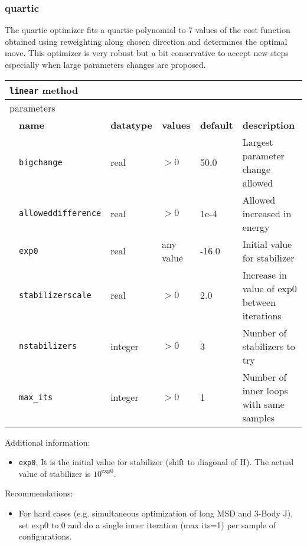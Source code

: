 \subsubsection{quartic}
The quartic optimizer fits a quartic polynomial to 7 values of the cost function obtained using reweighting along chosen direction and determines the optimal move.
This optimizer is very robust but a bit conservative to accept new steps especially when large parameters changes are proposed.
\begin{table}[h]
\begin{center}
\begin{tabularx}{\textwidth}{l l l l l l }
\hline
\multicolumn{6}{l}{\texttt{linear} method} \\
\hline
\multicolumn{2}{l}{parameters}  & \multicolumn{4}{l}{}\\
   &   \bfseries name     & \bfseries datatype & \bfseries values & \bfseries default   & \bfseries description \\
   &   \texttt{bigchange} &  real     & $>0$ & 50.0  & Largest parameter change allowed\\
   &   \texttt{alloweddifference} &  real     & $>0$ & 1e-4 & Allowed increased in energy\\
   &   \texttt{exp0} &  real     & any value & -16.0 & Initial value for stabilizer\\
   &   \texttt{stabilizerscale} &  real     & $>0$ & 2.0 & Increase in value of exp0 between iterations\\
   &   \texttt{nstabilizers} &  integer     & $>0$ & 3 & Number of stabilizers to try\\
   &   \texttt{max\_its} &  integer   & $>0$ & 1 & Number of inner loops with same samples\\
  \hline
\end{tabularx}
\end{center}
\end{table}

Additional information:
\begin{itemize}
\item \texttt{exp0}. It is the initial value for stabilizer (shift to diagonal of H). The actual value of stabilizer is $10^\textrm{exp0}$.
\end{itemize}

Recommendations:
\begin{itemize}
  \item{For hard cases (e.g. simultaneous optimization of long MSD and 3-Body J), set exp0
to 0 and do a single inner iteration (max its=1) per sample of configurations.}
\end{itemize}

